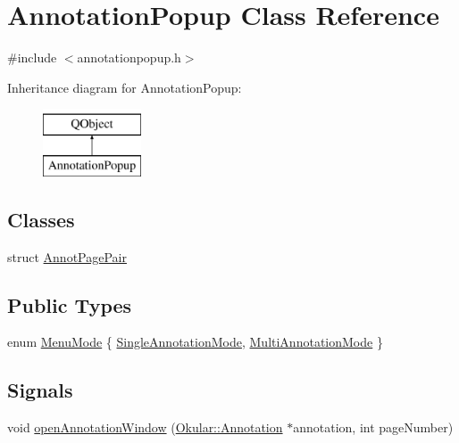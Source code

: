 \hypertarget{classAnnotationPopup}{\section{Annotation\+Popup Class Reference}
\label{classAnnotationPopup}
}


{\ttfamily \#include $<$annotationpopup.\+h$>$}

Inheritance diagram for Annotation\+Popup\+:\begin{figure}[H]
\begin{center}
\leavevmode
\includegraphics[height=2.000000cm]{classAnnotationPopup}
\end{center}
\end{figure}
\subsection*{Classes}
\begin{DoxyCompactItemize}
\item 
struct \hyperlink{structAnnotationPopup_1_1AnnotPagePair}{Annot\+Page\+Pair}
\end{DoxyCompactItemize}
\subsection*{Public Types}
\begin{DoxyCompactItemize}
\item 
enum \hyperlink{classAnnotationPopup_af8654f3f9c2a3377f86daf329f1e0679}{Menu\+Mode} \{ \hyperlink{classAnnotationPopup_af8654f3f9c2a3377f86daf329f1e0679a40137692e843ce4f994737bd4a6f68f1}{Single\+Annotation\+Mode}, 
\hyperlink{classAnnotationPopup_af8654f3f9c2a3377f86daf329f1e0679addf6a6dddf8c14065bb700f1835dafb9}{Multi\+Annotation\+Mode}
 \}
\end{DoxyCompactItemize}
\subsection*{Signals}
\begin{DoxyCompactItemize}
\item 
void \hyperlink{classAnnotationPopup_a2f542d2aa2c7cc85b4bc9045be5adcc9}{open\+Annotation\+Window} (\hyperlink{classOkular_1_1Annotation}{Okular\+::\+Annotation} $\ast$annotation, int page\+Number)
\end{DoxyCompactItemize}
